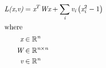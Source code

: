 \documentclass[12pt]{article}
\begin{document}
\begin{center}
\resizebox{\textwidth}{!} 
{
\begin{minipage}[c]{\textwidth}
\begin{align*}
\textit{L(x,v)} & = \textit{x}^T\textit{W}\textit{x} + \sum_\textit{i} \textit{v}_{ \textit{i} }\left( \textit{x}_{ \textit{i} }^{2} - 1 \right) \\
\intertext{where} 
\textit{x} & \in \mathbb{R}^{ \textit{n}} \\
\textit{W} & \in \mathbb{R}^{ \textit{n} \times \textit{n} } \\
\textit{v} & \in \mathbb{R}^{ \textit{n}} \\
\\
\end{align*}
\end{minipage}
}
\end{center}
\end{document}
